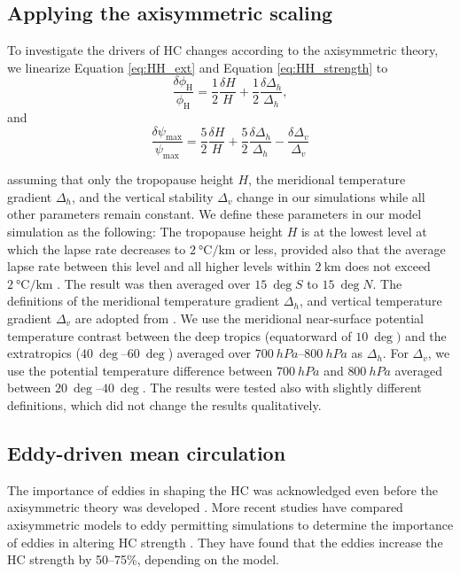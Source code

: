 \subsection{Applying the axisymmetric scaling}\label{subsec:apply_HH}

\label{sec:lin}
To investigate the drivers of HC changes according to the axisymmetric theory, we linearize Equation \eqref{eq:HH_ext} and Equation \eqref{eq:HH_strength} to
\begin{equation}
    \frac{\delta\phi_\mathrm{H}}{\phi_\mathrm{H}}=\frac{1}{2}\frac{\delta H}{H}+\frac{1}{2}\frac{\delta\Delta_h}{\Delta_h},
\end{equation}
and  
\begin{equation}
    \frac{\delta\psi_\mathrm{max}}{\psi_\mathrm{max}}=\frac{5}{2}\frac{\delta H}{H}+\frac{5}{2}\frac{\delta\Delta_h}{\Delta_h}-\frac{\delta\Delta_v}{\Delta_v}
\end{equation}

assuming that only the tropopause height $H$, the meridional temperature gradient $\Delta_h$, and the vertical stability $\Delta_v$ change in our simulations while all other parameters remain constant. We define these parameters in our model simulation as the following: The tropopause height $H$ is at the lowest level at which the lapse rate decreases to $\SI{2}{\degreeCelsius\per\km}$ or less, provided also that the average lapse rate between this level and all higher levels within $\SI{2}{\km}$ does not exceed $\SI{2}{\degreeCelsius\per\km}$ \parencite{worldmeteorologicalorganizationInternationalMeteorologicalVocabulary1992}. The result was then averaged over $\SI{15}{\deg S}$ to $\SI{15}{\deg N}$. The definitions of the meridional temperature gradient $\Delta_h$, and vertical temperature gradient $\Delta_v$ are adopted from \textcite{dagostinoFactorsControllingHadley2017}. We use the meridional near-surface potential temperature contrast between the deep tropics (equatorward of $\SI{10}{\deg})$ and the extratropics ($\SIrange{40}{60}{\deg}$) averaged over $\SIrange{700}{800}{hPa}$ as $\Delta_h$. For $\Delta_v$, we use the potential temperature difference between $\SI{700}{hPa}$ and $\SI{800}{hPa}$ averaged between $\SIrange{20}{40}{\deg}$.
The results were tested also with slightly different definitions, which did not change the results qualitatively. 



\subsection{Eddy-driven mean circulation}\label{sec:theo_eddy}
The importance of eddies in shaping the HC was acknowledged even before the axisymmetric theory was developed \parencite{kuoFORCEDFREEMERIDIONAL1956}. More recent studies have compared axisymmetric models to eddy permitting simulations to determine the importance of eddies in altering HC strength \parencite{walkerEddyInfluencesHadley2006,singhEddyInfluencesStrength2017}. They have found that the eddies increase the HC strength by 50--75\%, depending on the model.

